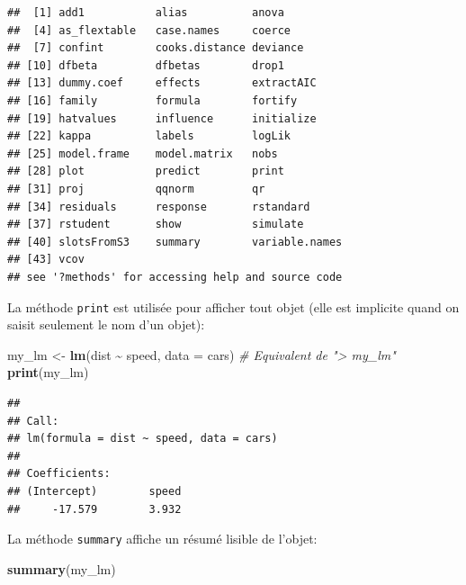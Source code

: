 \documentclass[
  12pt,
  french,
  a4paper,
  extrafontsizes,onecolumn,openright
  ]{memoir}
\newenvironment{Shaded}{\begin{snugshade}}{\end{snugshade}}
\newcommand{\AttributeTok}[1]{\textcolor[rgb]{0.13,0.29,0.53}{#1}}
\newcommand{\CommentTok}[1]{\textcolor[rgb]{0.56,0.35,0.01}{\textit{#1}}}
\newcommand{\FunctionTok}[1]{\textcolor[rgb]{0.13,0.29,0.53}{\textbf{#1}}}
\newcommand{\NormalTok}[1]{#1}
\newcommand{\OtherTok}[1]{\textcolor[rgb]{0.56,0.35,0.01}{#1}}
\newcommand{\SpecialCharTok}[1]{\textcolor[rgb]{0.81,0.36,0.00}{\textbf{#1}}}
\begin{document}
\begin{verbatim}
##  [1] add1           alias          anova         
##  [4] as_flextable   case.names     coerce        
##  [7] confint        cooks.distance deviance      
## [10] dfbeta         dfbetas        drop1         
## [13] dummy.coef     effects        extractAIC    
## [16] family         formula        fortify       
## [19] hatvalues      influence      initialize    
## [22] kappa          labels         logLik        
## [25] model.frame    model.matrix   nobs          
## [28] plot           predict        print         
## [31] proj           qqnorm         qr            
## [34] residuals      response       rstandard     
## [37] rstudent       show           simulate      
## [40] slotsFromS3    summary        variable.names
## [43] vcov          
## see '?methods' for accessing help and source code
\end{verbatim}

\normalsize

La méthode \texttt{print} est utilisée pour afficher tout objet (elle est implicite quand on saisit seulement le nom d'un objet):

\scriptsize

\begin{Shaded}
\begin{Highlighting}[]
\NormalTok{my\_lm }\OtherTok{\textless{}{-}} \FunctionTok{lm}\NormalTok{(dist }\SpecialCharTok{\textasciitilde{}}\NormalTok{ speed, }\AttributeTok{data =}\NormalTok{ cars)}
\CommentTok{\# Equivalent de "\textgreater{} my\_lm"}
\FunctionTok{print}\NormalTok{(my\_lm)}
\end{Highlighting}
\end{Shaded}

\begin{verbatim}
## 
## Call:
## lm(formula = dist ~ speed, data = cars)
## 
## Coefficients:
## (Intercept)        speed  
##     -17.579        3.932
\end{verbatim}

\normalsize

La méthode \texttt{summary} affiche un résumé lisible de l'objet:

\scriptsize

\begin{Shaded}
\begin{Highlighting}[]
\FunctionTok{summary}\NormalTok{(my\_lm)}
\end{Highlighting}
\end{Shaded}
\end{document}
